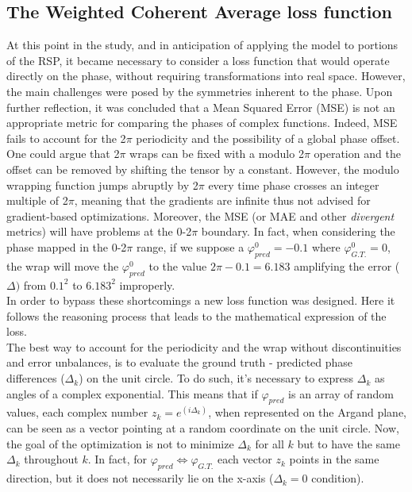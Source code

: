 \subsection{The Weighted Coherent Average loss function}
At this point in the study, and in anticipation of applying the model to portions of the RSP, it became necessary to 
consider a loss function that would operate directly on the phase, without requiring transformations into real space. 
However, the main challenges were posed by the symmetries inherent to the phase. Upon further reflection, it was concluded
that a Mean Squared Error (MSE) is not an appropriate metric for comparing the phases of complex functions. Indeed, MSE 
fails to account for the 2$\pi$ periodicity and the possibility of a global phase offset. One could argue that 2$\pi$ wraps 
can be fixed with a modulo 2$\pi$ operation and the offset can be removed by shifting the tensor by a constant. However, 
the modulo wrapping function jumps abruptly by 2$\pi$ every time phase crosses an integer multiple of 2$\pi$, meaning that 
the gradients are infinite thus not advised for gradient-based optimizations. Moreover, the MSE (or MAE and other 
\textit{divergent} metrics) will have problems at the 0-2$\pi$ boundary. In fact, when considering the phase mapped in the
0-2$\pi$ range, if we suppose a $\varphi_{pred}^0 = -0.1$ where $\varphi_{G.T.}^0 = 0$, the wrap will move the $\varphi_{pred}^0$ to the value 
$2\pi - 0.1 = 6.183$ amplifying the error ( $\Delta )$ from $0.1^2$ to $6.183^2$ improperly.
\\
In order to bypass these shortcomings a new loss function was designed. Here it follows the reasoning process that leads
to the mathematical expression of the loss. \\
The best way to account for the periodicity and the wrap without discontinuities 
and error unbalances, is to evaluate the ground truth - predicted phase differences ($\Delta_k$) on the unit circle. 
To do such, it's necessary to express $\Delta_k$ as angles of a complex exponential. This means that if $\varphi_{pred}$ is an array of 
random values, each complex number $ z_k = e^{(i\Delta_k)}$, when represented on the Argand plane, can be seen as a 
vector pointing at a random coordinate on the unit circle. Now, the goal of the optimization is not to minimize $\Delta_k$ 
for all $k$ but to have the same $\Delta_k$ throughout $k$. In fact, for $\varphi_{pred} \Leftrightarrow \varphi_{G.T.}$ each 
vector $z_k$ points in the same direction, but it does not necessarily lie on the x-axis ($\Delta_k = 0 $ condition). 
